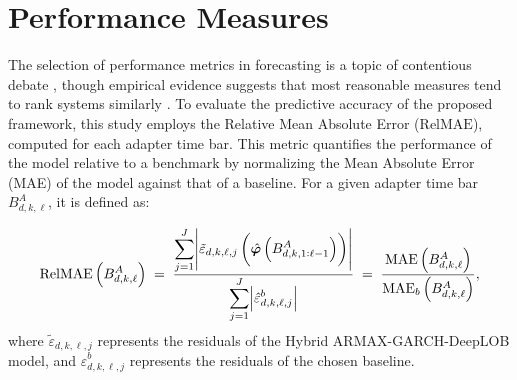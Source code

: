 \documentclass[10pt,a4paper,oneside]{article}
\DeclarePairedDelimiter{\aval}{\lvert}{\rvert} %
\providecommand{\DIFdeltex}[1]{{\protect\color{red} \scriptsize #1}} %
\providecommand{\DIFdelbegin}{} %
\providecommand{\DIFdelend}{} %
\providecommand{\DIFdel}[1]{\texorpdfstring{\DIFdeltex{#1}}{}} %
\newcommand{\DIFscaledelfig}{0.5}
\newlength{\DIFdelgraphicswidth} %
\newlength{\DIFdelgraphicsheight} %
\newcommand{\DIFdelincludegraphics}[2][]{%
\sbox{\DIFdelgraphicsbox}{\DIFOincludegraphics[#1]{#2}}%
\settoboxwidth{\DIFdelgraphicswidth}{\DIFdelgraphicsbox} %
\settoboxtotalheight{\DIFdelgraphicsheight}{\DIFdelgraphicsbox} %
\scalebox{\DIFscaledelfig}{%
\parbox[b]{\DIFdelgraphicswidth}{\usebox{\DIFdelgraphicsbox}\\[-\baselineskip] \rule{\DIFdelgraphicswidth}{0em}}\llap{\resizebox{\DIFdelgraphicswidth}{\DIFdelgraphicsheight}{%
\setlength{\unitlength}{\DIFdelgraphicswidth}%
\begin{picture}(1,1)%
\thicklines\linethickness{2pt} %
{\color[rgb]{1,0,0}\put(0,0){\framebox(1,1){}}}%
{\color[rgb]{1,0,0}\put(0,0){\line( 1,1){1}}}%
{\color[rgb]{1,0,0}\put(0,1){\line(1,-1){1}}}%
\end{picture}%
}\hspace*{3pt}}} %
} %
\DeclareRobustCommand{\DIFdelbegin}{\DIFOdelbegin \let\includegraphics\DIFdelincludegraphics} %
\DeclareRobustCommand{\DIFdelend}{\DIFOaddend \let\includegraphics\DIFOincludegraphics} %
\begin{document}

\section{Performance Measures}
\label{sec:performance_measures}

The selection of performance metrics in forecasting is a topic of contentious debate \DIFdelbegin \DIFdel{, }\DIFdelend though empirical evidence suggests that most reasonable measures tend to rank systems similarly \cite{Koutsandreas2021}. To evaluate the predictive accuracy of the proposed framework, this study employs the Relative Mean Absolute Error ($\mathrm{RelMAE}$), computed for each adapter time bar. This metric quantifies the performance of the model relative to a benchmark by normalizing the Mean Absolute Error (MAE) of the model against that of a baseline. For a given adapter time bar $B^A_{d, k, \ell}$, it is defined as:

\[
    \mathrm{RelMAE}\left( B^A_{d, k, \ell} \right)
    \;=\;
    \frac{\displaystyle\sum_{j=1}^{J} \aval*{\tilde{\varepsilon}_{d, k, \ell, j}\left( \hat{\boldsymbol{\varphi}} \left( B^A_{d,k,1:\ell - 1} \right) \right)}}{\displaystyle\sum_{j=1}^{J} \aval*{\hat{\varepsilon}^b_{d, k, \ell, j}}}
    \;=\;
    \frac{\mathrm{MAE}\left( B^A_{d, k, \ell} \right)}{\mathrm{MAE}_{b}\left( B^A_{d, k, \ell} \right)},
\]
where $\tilde{\varepsilon}_{d, k, \ell, j}$ represents the residuals of the Hybrid ARMAX-GARCH-DeepLOB model, and $\hat{\varepsilon}^b_{d, k, \ell, j}$ represents the residuals of the chosen baseline.
\end{document}
